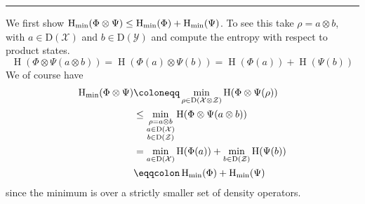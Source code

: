 \documentclass[boxes,pages,color=SeaGreen]{homework}
\renewcommand{\op}[1]{\operatorname{#1}}
\newcommand{\X}{\mathcal{X}}
\newcommand{\Y}{\mathcal{Y}}
\newcommand{\Z}{\mathcal{Z}}
\newcommand{\Density}{\mathrm{D}}
\begin{document}
{\noindent\color{SeaGreen!30}\rule{\textwidth}{1.5pt}}

\begin{solution}
  We first show $\op{H}_{\text{min}}(\Phi\otimes\Psi) \leq \op{H}_{\text{min}}(\Phi) + \op{H}_{\textup{min}}(\Psi)$.
  To see this take $\rho = a \otimes b$, with $a\in\Density(\X)$ and $b\in\Density(\Y)$ and compute the entropy with respect to product states.
  \begin{equation*}
    \op{H}(\Phi\otimes\Psi(a\otimes b)) = \op{H}(\Phi(a)\otimes\Psi(b)) = \op{H}(\Phi(a)) + \op{H}(\Psi(b))
  \end{equation*}
  We of course have
  \begin{align*}
    \op{H}_\text{min}(\Phi\otimes\Psi) & \defeq \min_{\rho\in\Density(\X\otimes\Z)}\op{H}(\Phi\otimes\Psi(\rho))           \\
                                       & \leq \min_{\substack{\rho = a \otimes b                                           \\ a\in\Density(\X) \\ b\in\Density(\Z)}}\op{H}(\Phi\otimes\Psi(a\otimes b)) \\
                                       & = \min_{a\in\Density(\X)}\op{H}(\Phi(a)) + \min_{b\in\Density(\Z)}\op{H}(\Psi(b)) \\
                                       & \eqdef \op{H}_\text{min}(\Phi) + \op{H}_\text{min}(\Psi)
  \end{align*}
  since the minimum is over a strictly smaller set of density operators.


\end{solution}
\end{document}
